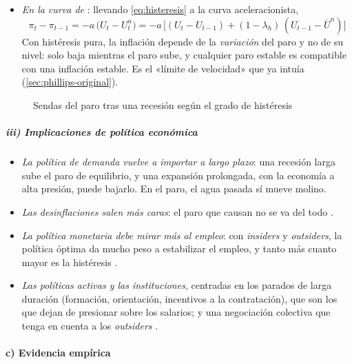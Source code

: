 \documentclass[11pt]{article}
\begin{document}
\begin{itemize}
\begin{itemize}
  \end{itemize}
\item \emph{En la curva de }: llevando \eqref{eq:histeresis} a la curva aceleracionista,
  \begin{equation}
  \pi_t-\pi_{t-1}=-a\,\big(U_t-U^n_t\big)=-a\,\big[(U_t-U_{t-1})+(1-\lambda_h)\,(U_{t-1}-\overline U^n)\big] \label{eq:phillips-histeresis}
  \end{equation}
  Con histéresis pura, la inflación depende de la \emph{variación} del paro y no de su nivel: solo baja mientras el paro sube, y cualquier paro estable es compatible con una inflación estable. Es el «límite de velocidad» que ya intuía  (\ref{sec:phillips-original}).
\end{itemize}

\begin{figure}[H]
\centering
\caption{Sendas del paro tras una recesión según el grado de histéresis}\label{fig:histeresis-sendas}
\end{figure}

\subparagraph{iii) Implicaciones de política económica}

\begin{itemize}
\item \emph{La política de demanda vuelve a importar a largo plazo}: una recesión larga sube el paro de equilibrio, y una expansión prolongada, con la economía a alta presión, puede bajarlo. En el paro, el agua pasada sí mueve molino.
\item \emph{Las desinflaciones salen más caras}: el paro que causan no se va del todo .
\item \emph{La política monetaria debe mirar más al empleo}: con \emph{insiders} y \emph{outsiders}, la política óptima da mucho peso a estabilizar el empleo, y tanto más cuanto mayor es la histéresis\nocite{Gali2022Insider} .
\item \emph{Las políticas activas y las instituciones}, centradas en los parados de larga duración (formación, orientación, incentivos a la contratación), que son los que dejan de presionar sobre los salarios; y una negociación colectiva que tenga en cuenta a los \emph{outsiders} .
\end{itemize}

\paragraph{c) Evidencia empírica}
\end{document}
